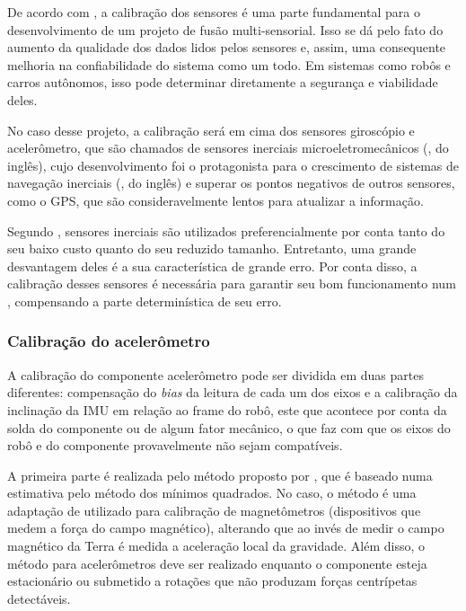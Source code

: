 \documentclass[acronym, symbols, table]{fei}
\begin{document}
		De acordo com \textcite{lv2020targetless}, a calibração dos sensores é uma parte fundamental para o desenvolvimento de um projeto de fusão multi-sensorial. Isso se dá pelo fato do aumento da qualidade dos dados lidos pelos sensores e, assim, uma consequente melhoria na confiabilidade do sistema como um todo. Em sistemas como robôs e carros autônomos, isso pode determinar diretamente a segurança e viabilidade deles.
		
		No caso desse projeto, a calibração será em cima dos sensores giroscópio e acelerômetro, que são chamados de sensores inerciais microeletromecânicos (, do inglês), cujo desenvolvimento foi o protagonista para o crescimento de sistemas de navegação inerciais (, do inglês) e superar os pontos negativos de outros sensores, como o GPS, que são consideravelmente lentos para atualizar a informação.
		
		Segundo \textcite{9181212}, sensores inerciais  são utilizados preferencialmente por conta tanto do seu baixo custo quanto do seu reduzido tamanho. Entretanto, uma grande desvantagem deles é a sua característica de grande erro. Por conta disso, a calibração desses sensores é necessária para garantir seu bom funcionamento num , compensando a parte determinística de seu erro.
		
			\subsubsection{Calibração do acelerômetro}
			
			A calibração do componente acelerômetro pode ser dividida em duas partes diferentes: compensação do \textit{bias} da leitura de cada um dos eixos e a calibração da inclinação da IMU em relação ao frame do robô, este que acontece por conta da solda do componente ou de algum fator mecânico, o que faz com que os eixos do robô e do componente provavelmente não sejam compatíveis.
			
			A primeira parte é realizada pelo método proposto por \textcite{menezes2020triaxial}, que é baseado numa estimativa pelo método dos mínimos quadrados. No caso, o método é uma adaptação de  utilizado para calibração de magnetômetros (dispositivos que medem a força do campo magnético), alterando que ao invés de medir o campo magnético da Terra é medida a aceleração local da gravidade. Além disso, o método para acelerômetros deve ser realizado enquanto o componente esteja estacionário ou submetido a rotações que não produzam forças centrípetas detectáveis.
			
\end{document}
